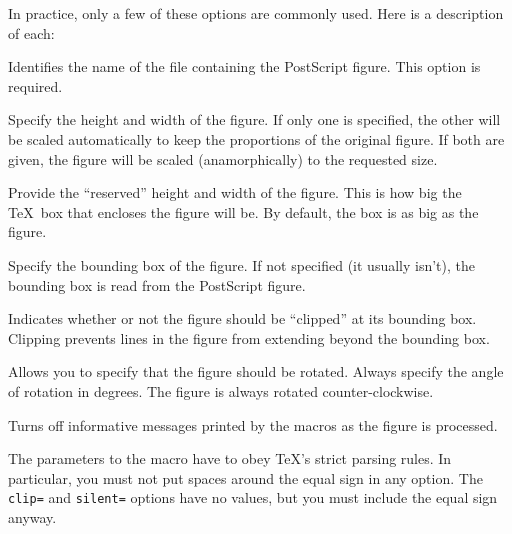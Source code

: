 \begin{shortexample}
\end{shortexample}

In practice, only a few of these options are commonly used. Here is a
description of each:

\begin{iplist}[\textnormal]{.25in}
  \ipitem[\texttt{figure=}]

        Identifies the name of the file containing the 
        PostScript figure.  This option is required.

  \ipitem[\texttt{height=, width=}]

        Specify the height and width of the figure.
        If only one is specified, the other will be scaled automatically
        to keep the proportions of the original figure.  If both are given,
        the figure will be scaled (anamorphically) to the requested size.

  \ipitem[\texttt{rheight=, rwidth=}] 
        Provide the ``reserved'' height and width 
        of the figure.  This is how big the \TeX\ box that encloses the
        figure will be.  By default, the box is as big as the figure.

  \ipitem[\texttt{bbllx=, bblly=, bburx=, bbury=}] 
        Specify the bounding box
        of the figure.  If not specified (it usually isn't), the bounding
        box is read from the PostScript figure.

  \ipitem[\texttt{clip=}]

        Indicates whether or not the figure should be ``clipped''
        at its bounding box.  Clipping prevents lines in the figure from
        extending beyond the bounding box.

  \ipitem[\texttt{angle=}]

        Allows you to specify that the figure should be rotated.
        Always specify the angle of rotation in degrees.  The figure
        is always rotated counter-clockwise.

  \ipitem[\texttt{silent=}]

        Turns off informative messages printed by the 
        macros as the figure is processed.
\end{iplist}

The parameters to the  macro have to obey \TeX's strict
parsing rules.  In particular, you must not put spaces around the
equal sign in any option.  The \verb|clip=| and \verb|silent=| 
options have no values, but you must include the equal sign anyway.

